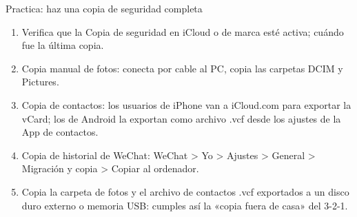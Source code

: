 \begin{tcbpractice}{Practica: haz una copia de seguridad completa}
\begin{enumerate}
  \item Verifica que la Copia de seguridad en iCloud o de marca esté activa; cuándo fue la última copia.
  \item Copia manual de fotos: conecta por cable al PC, copia las carpetas DCIM y Pictures.
  \item Copia de contactos: los usuarios de iPhone van a iCloud.com para exportar la vCard; los de Android la exportan como archivo .vcf desde los ajustes de la App de contactos.
  \item Copia de historial de WeChat: WeChat > Yo > Ajustes > General > Migración y copia > Copiar al ordenador.
  \item Copia la carpeta de fotos y el archivo de contactos .vcf exportados a un disco duro externo o memoria USB: cumples así la «copia fuera de casa» del 3-2-1.
\end{enumerate}

\end{tcbpractice}

